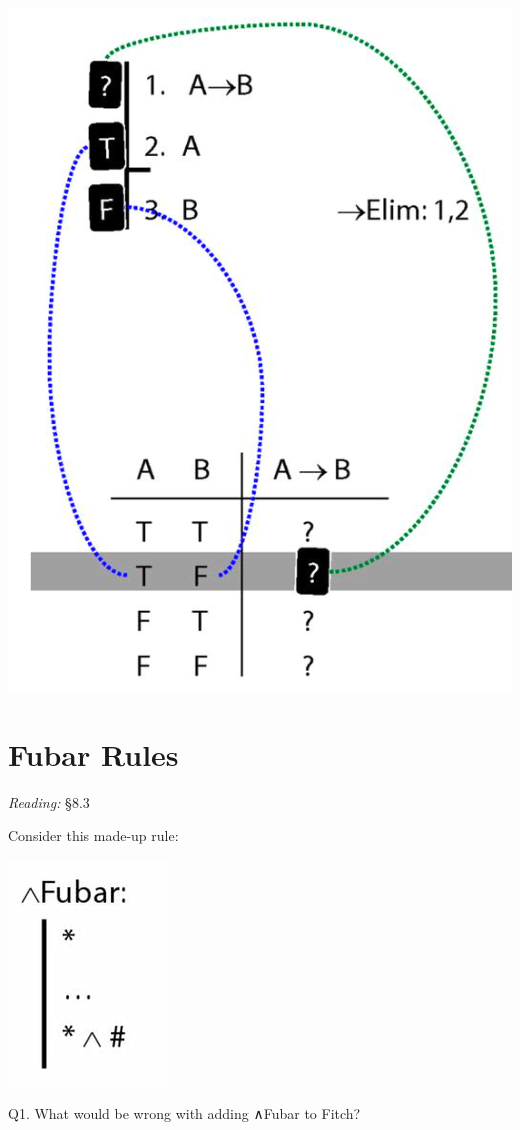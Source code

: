 \documentclass[12pt]{extarticle}
\begin{document}
\begin{multicols*}{3}
\begin{center}
\includegraphics[scale=0.3]{img/unit_700_rule_to_tt.png}
\end{center}
 
 
\section{Fubar Rules}
 
\emph{Reading:} §8.3
 
\begin{minipage}{\columnwidth}
 
Consider this made-up rule:
 
\begin{center}
\includegraphics[scale=0.3]{img/fubar_rule.png}
\end{center}
Q1. What would be wrong with adding ∧Fubar to Fitch?
 

\end{minipage}
\end{multicols*}
\end{document}
